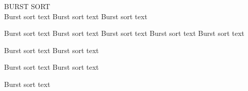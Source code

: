 {\sffamily\normalsize{\color{sciorange} BURST SORT}}\vspace{1mm}\\
\footnotesize 
Burst sort text    
Burst sort text    
Burst sort text    

Burst sort text    
Burst sort text    
Burst sort text    
Burst sort text    
Burst sort text    

Burst sort text    
Burst sort text    

Burst sort text    
Burst sort text    

Burst sort text   
